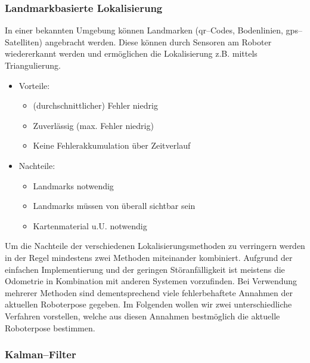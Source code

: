 \subsubsection{Landmarkbasierte Lokalisierung}

In einer bekannten Umgebung können Landmarken (\gls{qr}--Codes, Bodenlinien,
 \gls{gps}--Satelliten) angebracht werden. Diese können durch Sensoren
 am Roboter wiedererkannt werden und ermöglichen die Lokalisierung
 z.B. mittels Triangulierung.

\begin{itemize}
  \item Vorteile:
  \begin{itemize}
    \item (durchschnittlicher) Fehler niedrig
    \item Zuverlässig (max. Fehler niedrig)
    \item Keine Fehlerakkumulation über Zeitverlauf
  \end{itemize}
  \item Nachteile:
  \begin{itemize}
    \item Landmarks notwendig
    \item Landmarks müssen von überall sichtbar sein
    \item Kartenmaterial u.U. notwendig
   \end{itemize}
\end{itemize}

Um die Nachteile der verschiedenen Lokalisierungsmethoden zu
 verringern werden in der Regel mindestens zwei Methoden miteinander
 kombiniert. Aufgrund der einfachen Implementierung und der geringen
 Störanfälligkeit ist meistens die Odometrie in Kombination mit
 anderen Systemen vorzufinden. Bei Verwendung mehrerer Methoden sind
 dementsprechend viele fehlerbehaftete Annahmen der aktuellen
 Roboterpose gegeben. Im Folgenden wollen wir zwei unterschiedliche
 Verfahren vorstellen, welche aus diesen Annahmen bestmöglich die
 aktuelle Roboterpose bestimmen.
 
\subsubsection{Kalman--Filter}

